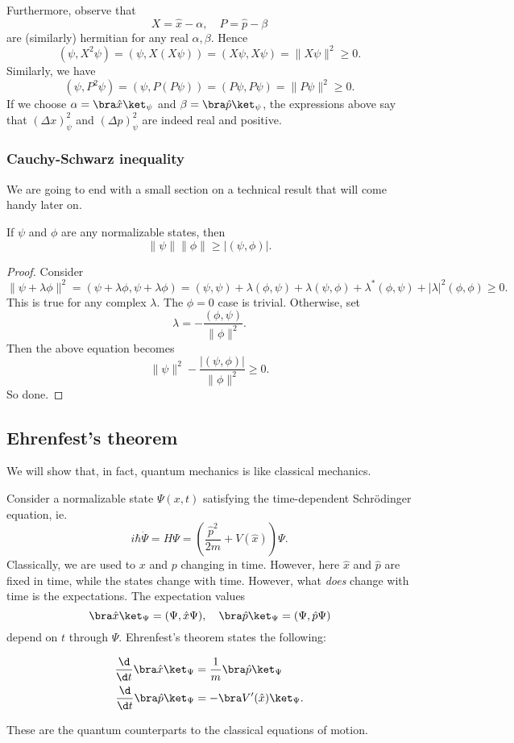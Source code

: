 \documentclass[a4paper]{article}
\begin{document}
Furthermore, observe that
\[
  X = \hat{x} - \alpha,\quad P = \hat{p} - \beta
\]
are (similarly) hermitian for any real $\alpha, \beta$. Hence
\[
  (\psi, X^2 \psi) = (\psi, X(X\psi)) = (X\psi, X\psi) = \|X\psi\|^2 \geq 0.
\]
Similarly, we have
\[
  (\psi, P^2 \psi) = (\psi, P(P\psi)) = (P\psi, P\psi) = \|P\psi\|^2 \geq 0.
\]
If we choose $\alpha = \bra \hat{x}\ket_\psi$ and $\beta = \bra \hat{p}\ket_\psi$, the expressions above say that $(\Delta x)^2_\psi$ and $(\Delta p)^2_\psi$ are indeed real and positive.
\subsubsection{Cauchy-Schwarz inequality}
We are going to end with a small section on a technical result that will come handy later on.
\begin{prop}
  If $\psi$ and $\phi$ are any normalizable states, then
  \[
    \|\psi\|\|\phi\| \geq |(\psi, \phi)|.
  \]
\end{prop}

\begin{proof}
  Consider
  \[
    \|\psi + \lambda \phi\|^2 = (\psi + \lambda \phi, \psi + \lambda \phi) = (\psi, \psi) + \lambda(\phi, \psi) + \lambda(\psi, \phi) + \lambda^*(\phi, \psi) + |\lambda|^2 (\phi, \phi) \geq 0.
  \]
  This is true for any complex $\lambda$. The $\phi = 0$ case is trivial. Otherwise, set
  \[
    \lambda = -\frac{(\phi, \psi)}{\|\phi\|^2}.
  \]
  Then the above equation becomes
  \[
    \|\psi\|^2 - \frac{|(\psi, \phi)|}{\|\phi\|^2} \geq 0.
  \]
  So done.
\end{proof}
\subsection{Ehrenfest's theorem}
We will show that, in fact, quantum mechanics is like classical mechanics.

Consider a normalizable state $\Psi(x, t)$ satisfying the time-dependent Schr\"odinger equation, ie.
\[
  i\hbar \dot{\Psi} = H\Psi = \left(\frac{\hat{p}^2}{2m} + V(\hat{x})\right) \Psi.
\]
Classically, we are used to $x$ and $p$ changing in time. However, here $\hat{x}$ and $\hat{p}$ are fixed in time, while the states change with time. However, what \emph{does} change with time is the expectations. The expectation values
\[
  \bra \hat{x}\ket_\Psi = (\Psi, \hat{x}\Psi),\quad \bra \hat{p}\ket_\Psi = (\Psi, \hat{p}\Psi)
\]
depend on $t$ through $\Psi$. Ehrenfest's theorem states the following:
\begin{thm}
  \begin{align*}
    \frac{\d}{\d t}\bra \hat{x}\ket_\Psi &= \frac{1}{m}\bra \hat{p}\ket_\Psi\\
    \frac{\d}{\d t}\bra \hat{p}\ket_\Psi &= -\bra V'(\hat{x})\ket_\Psi.
  \end{align*}
\end{thm}
These are the quantum counterparts to the classical equations of motion.
\end{document}
